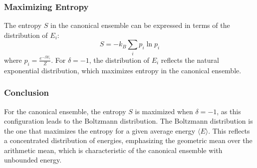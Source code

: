 \documentclass{article}
\begin{document}
\subsubsection{Maximizing Entropy}

The entropy \(S\) in the canonical ensemble can be expressed in terms of the distribution of \(E_i\):
\[
S = -k_B \sum_i p_i \ln p_i
\]
where \(p_i = \frac{e^{-\beta E_i}}{Z}\). For \(\delta = -1\), the distribution of \(E_i\) reflects the natural exponential distribution, which maximizes entropy in the canonical ensemble.

\subsubsection{Conclusion}

For the canonical ensemble, the entropy \(S\) is maximized when \(\delta = -1\), as this configuration leads to the Boltzmann distribution. The Boltzmann distribution is the one that maximizes the entropy for a given average energy \(\langle E \rangle\). This reflects a concentrated distribution of energies, emphasizing the geometric mean over the arithmetic mean, which is characteristic of the canonical ensemble with unbounded energy.
\end{document}
